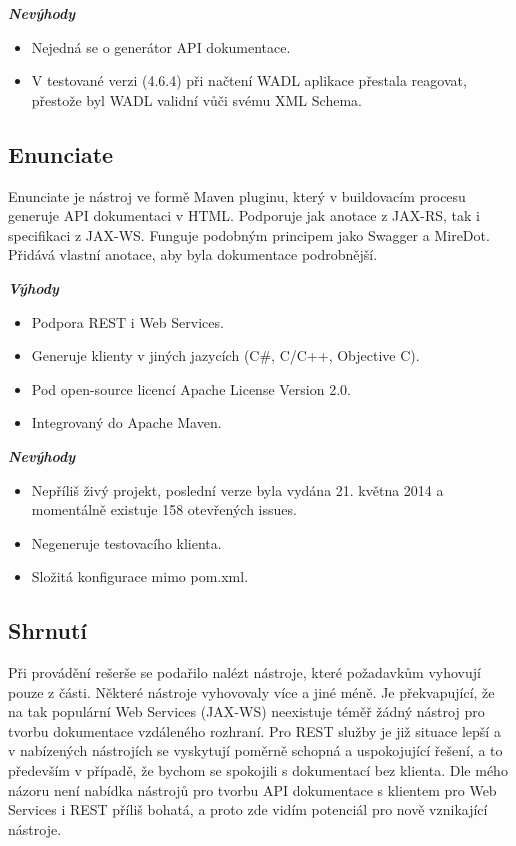 \documentclass[11pt,twoside,a4paper]{book}
\begin{document}
\textbf{\textit{Nevýhody}}

\begin{itemize}
  \item Nejedná se o generátor API dokumentace.
  \item V testované verzi (4.6.4) při načtení WADL aplikace přestala reagovat, přestože byl
WADL validní vůči svému XML Schema.
\end{itemize}

\subsection{Enunciate}

Enunciate je nástroj ve formě Maven pluginu, který v buildovacím procesu generuje API
dokumentaci v HTML. Podporuje jak anotace z JAX-RS, tak i specifikaci z JAX-WS.
Funguje podobným principem jako Swagger a MireDot. Přidává vlastní anotace, aby byla
dokumentace podrobnější.

\textbf{\textit{Výhody}}

\begin{itemize}
  \item Podpora REST i Web Services.
  \item Generuje klienty v jiných jazycích (C\#, C/C++, Objective C).
  \item Pod open-source licencí Apache License Version 2.0.
  \item Integrovaný do Apache Maven.
\end{itemize}

\textbf{\textit{Nevýhody}}

\begin{itemize}
  \item Nepříliš živý projekt, poslední verze byla vydána 21. května 2014 a momentálně
existuje 158 otevřených issues.
  \item Negeneruje testovacího klienta.
  \item Složitá konfigurace mimo pom.xml.
\end{itemize}

\subsection{Shrnutí}

Při provádění rešerše se podařilo nalézt nástroje, které požadavkům vyhovují pouze z části.
Některé nástroje vyhovovaly více a jiné méně. Je překvapující, že na tak populární Web
Services (JAX-WS) neexistuje téměř žádný nástroj pro tvorbu dokumentace vzdáleného
rozhraní. Pro REST služby je již situace lepší a v nabízených nástrojích se vyskytují poměrně
schopná a uspokojující řešení, a to především v případě, že bychom se spokojili s
dokumentací bez klienta. Dle mého názoru není nabídka nástrojů pro tvorbu API
dokumentace s klientem pro Web Services i REST příliš bohatá, a proto zde vidím potenciál
pro nově vznikající nástroje.
\end{document}
